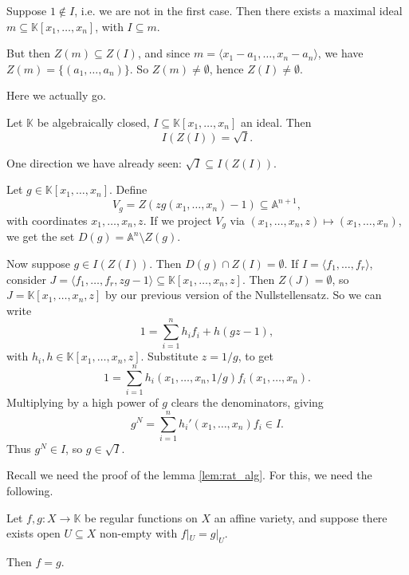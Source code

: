 \documentclass[12pt]{article}
\begin{document}
\begin{proofbox}
	Suppose $1 \not \in I$, i.e. we are not in the first case. Then there exists a maximal ideal $m \subseteq \mathbb{K}[x_1, \ldots, x_n]$, with $I \subseteq m$.

	But then $Z(m) \subseteq Z(I)$, and since $m = \langle x_1 - a_1, \ldots, x_n - a_n \rangle$, we have $Z(m) = \{(a_1, \ldots, a_n)\}$. So $Z(m) \neq \emptyset$, hence $Z(I) \neq \emptyset$.
\end{proofbox}

Here we actually go.

\begin{theorem}
	Let $\mathbb{K}$ be algebraically closed, $I \subseteq \mathbb{K}[x_1, \ldots, x_n]$ an ideal. Then
	\[
	I(Z(I)) = \sqrt I.
	\]
\end{theorem}

\begin{proofbox}
	One direction we have already seen: $\sqrt I \subseteq I(Z(I))$.

	Let $g \in \mathbb{K}[x_1, \ldots, x_n]$. Define
	\[
	V_g = Z(z g(x_1, \ldots, x_n) - 1) \subseteq \mathbb{A}^{n+1},
	\]
	with coordinates $x_1, \ldots, x_n, z$. If we project $V_g$ via $(x_1, \ldots, x_n, z) \mapsto (x_1, \ldots, x_n)$, we get the set $D(g) = \mathbb{A}^n \setminus Z(g)$.

	Now suppose $g \in I(Z(I))$. Then $D(g) \cap Z(I) = \emptyset$. If $I = \langle f_1, \ldots, f_r \rangle$, consider $J = \langle f_1, \ldots, f_r, zg - 1\rangle \subseteq \mathbb{K}[x_1, \ldots, x_n, z]$. Then $Z(J) = \emptyset$, so $J = \mathbb{K}[x_1, \ldots, x_n, z]$ by our previous version of the Nullstellensatz. So we can write
	\[
	1 = \sum_{i = 1}^n h_i f_i + h (gz - 1),
	\]
	with $h_i, h \in \mathbb{K}[x_1, \ldots, x_n, z]$. Substitute $z = 1/g$, to get
	\[
	1 = \sum_{i = 1}^n h_i(x_1, \ldots, x_n, 1/g) f_i(x_1, \ldots, x_n).
	\]
	Multiplying by a high power of $g$ clears the denominators, giving
	\[
	g^N = \sum_{i = 1}^n h_i'(x_1, \ldots, x_n) f_i \in I.
	\]
	Thus $g^N \in I$, so $g \in \sqrt I$.
\end{proofbox}

Recall we need the proof of the lemma \ref{lem:rat_alg}. For this, we need the following.

\begin{lemma}
	Let $f, g : X \to \mathbb{K}$ be regular functions on $X$ an affine variety, and suppose there exists open $U \subseteq X$ non-empty with $f|_U = g|_U$.

	Then $f = g$.
\end{lemma}
\end{document}
